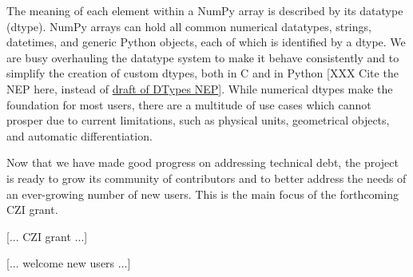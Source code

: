 The meaning of each element within a NumPy array is described by its
datatype (dtype). NumPy arrays can hold all common numerical
datatypes, strings, datetimes, and generic Python objects, each of
which is identified by a dtype.  We are busy overhauling the datatype
system to make it behave consistently and to simplify the creation of
custom dtypes, both in C and in Python [XXX Cite the NEP here, instead
of \href{https://github.com/numpy/numpy/pull/14422}{draft of DTypes NEP}].
While numerical dtypes make the foundation for most users,
there are a multitude of use cases which cannot prosper due to current
limitations, such as physical units\cite{astropy,Goldbaum2018,pint},
geometrical objects\cite{pygeos}, and automatic
differentiation\cite{pyadolc}.



Now that we have made good progress on addressing technical debt, the project
is ready to grow its community of contributors and to better address the needs
of an ever-growing number of new users.  This is the main focus of the
forthcoming CZI grant.

[... CZI grant ...]

[... welcome new users ...]






